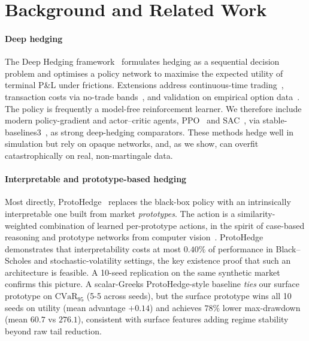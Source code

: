 \documentclass[sigconf,anonymous]{acmart}
\begin{document}
\section{Background and Related Work}
\label{sec:related}

\paragraph{Deep hedging} The Deep Hedging framework~\cite{buehler2019deep}
formulates hedging as a sequential decision problem and optimises a policy
network to maximise the expected utility of terminal P\&L under frictions.
Extensions address continuous-time trading~\cite{murray2022deep}, transaction
costs via no-trade bands~\cite{imaki2023notransaction}, and validation on
empirical option data~\cite{mikkila2023empirical}. The policy is frequently a
model-free reinforcement learner. We therefore include modern policy-gradient and
actor--critic agents, PPO~\cite{schulman2017ppo} and
SAC~\cite{haarnoja2018sac}, via stable-baselines3~\cite{raffin2021sb3}, as strong
deep-hedging comparators. These methods hedge well in simulation but rely on opaque
networks, and, as we show, can overfit catastrophically on real, non-martingale data.

\paragraph{Interpretable and prototype-based hedging} Most directly,
ProtoHedge~\cite{protohedge2025} replaces the black-box policy with an
intrinsically interpretable one built from market \emph{prototypes}. The action
is a similarity-weighted combination of learned per-prototype actions, in the
spirit of case-based reasoning and prototype networks from computer
vision~\cite{chen2019looks}. ProtoHedge demonstrates that interpretability costs
at most $0.40\%$ of performance in Black--Scholes and stochastic-volatility
settings, the key existence proof that such an architecture is feasible. A
10-seed replication on the same synthetic market confirms this picture. A
scalar-Greeks ProtoHedge-style baseline \emph{ties} our surface prototype on
$\mathrm{CVaR}_{95}$ (5-5 across seeds), but the surface prototype wins all 10
seeds on utility (mean advantage $+0.14$) and achieves $78\%$ lower
max-drawdown (mean $60.7$ vs $276.1$), consistent with surface features adding
regime stability beyond raw tail reduction.
\end{document}
